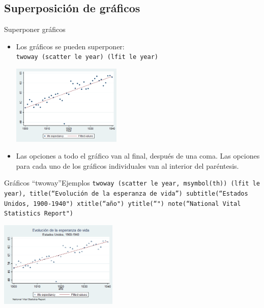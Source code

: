 \documentclass{beamer}
\begin{document}
\subsection{Superposición de gráficos}

\begin{frame}{Superponer gráficos}
\begin{itemize} 
\item Los gráficos se pueden superponer:\\
{\footnotesize \texttt{twoway (scatter  le year)  (lfit le year)}}\\\smallskip
\centerline{\includegraphics[height=3.8cm]{twsup.png}}
\item Las opciones a todo el gráfico van al final, después de una coma. Las opciones para cada uno de los gráficos individuales van al interior del paréntesis.
\end{itemize}
\end{frame}


\begin{frame}{Gráficos ``twoway''}{Ejemplos}
{\footnotesize \texttt{twoway (scatter le year, msymbol(th)) (lfit le year), title(``Evolución de la esperanza de vida'') subtitle(``Estados Unidos, 1900-1940") xtitle(``año") ytitle(``") note(``National Vital Statistics Report")}}\\\medskip
\centerline{\includegraphics[height=4.1cm]{twsup1.png}}
\end{frame}
\end{document}
